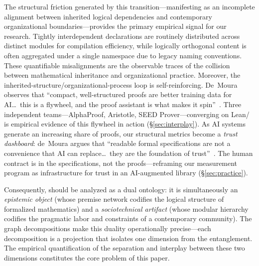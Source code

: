 The structural friction generated by this transition---manifesting as an incomplete alignment between inherited logical dependencies and contemporary organizational boundaries---provides the primary empirical signal for our research. Tightly interdependent declarations are routinely distributed across distinct modules for compilation efficiency, while logically orthogonal content is often aggregated under a single namespace due to legacy naming conventions. These quantifiable misalignments are the observable traces of the collision between mathematical inheritance and organizational practice. Moreover, the inherited-structure/organizational-process loop is self-reinforcing. De~Moura observes that ``compact, well-structured proofs are better training data for AI\ldots\ this is a flywheel, and the proof assistant is what makes it spin''~\cite{demoura2026proofassistants}. Three independent teams---AlphaProof, Aristotle, SEED Prover---converging on Lean/ is empirical evidence of this flywheel in action (\S\ref{sec:interplay}). As AI systems generate an increasing share of proofs, our structural metrics become a \emph{trust dashboard}: de~Moura argues that ``readable formal specifications are not a convenience that AI can replace\ldots\ they are the foundation of trust''~\cite{demoura2026proofassistants}. The human contract is in the specifications, not the proofs---reframing our measurement program as infrastructure for trust in an AI-augmented library (\S\ref{sec:practice}).

Consequently,  should be analyzed as a dual ontology: it is simultaneously an \textit{epistemic object} (whose premise network codifies the logical structure of formalized mathematics) and a \textit{sociotechnical artifact} (whose modular hierarchy codifies the pragmatic labor and constraints of a contemporary community). The graph decompositions make this duality operationally precise---each decomposition is a projection that isolates one dimension from the entanglement. The empirical quantification of the separation and interplay between these two dimensions constitutes the core problem of this paper.

